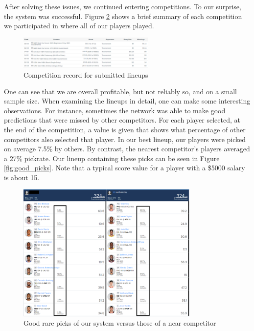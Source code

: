 After solving these issues, we continued entering competitions. To our surprise, the system was successful. Figure \ref{fig:win_record} shows a brief summary of each competition we participated in where all of our players played.
\begin{figure}[ht]
    \centering
    \includegraphics[width=0.6\textwidth]{figures/fanduel_comp}
    \caption{Competition record for submitted lineups}
    \label{fig:win_record}
\end{figure}
One can see that we are overall profitable, but not reliably so, and on a small sample size. When examining the lineups in detail, one can make some interesting observations. For instance, sometimes the network was able to make good predictions that were missed by other competitors. For each player selected, at the end of the competition, a value is given that shows what percentage of other competitors also selected that player. In our best lineup, our players were picked on average 7.5\% by others. By contrast, the nearest competitor's players averaged a 27\% pickrate. Our lineup containing these picks can be seen in Figure \ref{fig:good_picks}. Note that a typical score value for a player with a \$5000 salary is about 15.

\begin{figure}[ht]
    \centering
    \includegraphics[width=0.8\textwidth]{figures/mevsbest}
    \caption{Good rare picks of our system versus those of a near competitor}
    \label{fig:win_record}
\end{figure}

